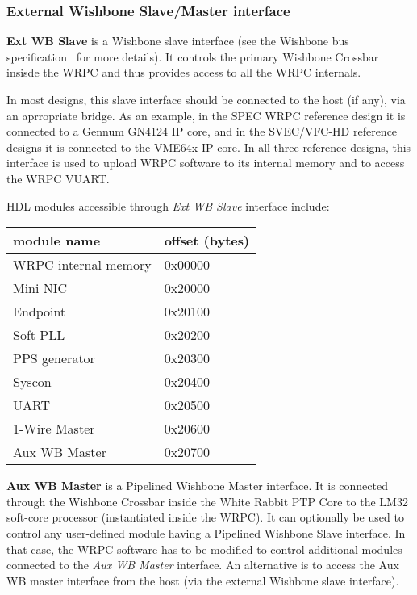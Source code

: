 \subsubsection{External Wishbone Slave/Master interface}
\label{sec:wrpc_wb}

{\bf Ext WB Slave} is a Wishbone slave interface (see the Wishbone bus specification~\cite{wb_spec}
for more details). It controls the primary Wishbone Crossbar insisde the WRPC and thus provides
access to all the WRPC internals.

In most designs, this slave interface should be connected to the host (if any), via an aprropriate
bridge. As an example, in the SPEC WRPC reference design it is connected to a Gennum GN4124 IP core,
and in the SVEC/VFC-HD reference designs it is connected to the VME64x IP core.  In all three
reference designs, this interface is used to upload WRPC software to its internal memory and to
access the WRPC VUART.

HDL modules accessible through \emph{Ext WB Slave} interface include:
\begin{center}
  \begin{tabular}{|l|l|}
    \hline {\bf module name} & {\bf offset (bytes)}\\
    \hline
    WRPC internal memory & 0x00000\\
                Mini NIC & 0x20000\\
                Endpoint & 0x20100\\
                Soft PLL & 0x20200\\
           PPS generator & 0x20300\\
                  Syscon & 0x20400\\
                    UART & 0x20500\\
           1-Wire Master & 0x20600\\
           Aux WB Master & 0x20700\\
    \hline
  \end{tabular}
\end{center}

{\bf Aux WB Master} is a Pipelined Wishbone Master interface. It is connected through the Wishbone
Crossbar inside the White Rabbit PTP Core to the LM32 soft-core processor (instantiated inside the
WRPC). It can optionally be used to control any user-defined module having a Pipelined Wishbone
Slave interface. In that case, the WRPC software has to be modified to control additional modules
connected to the \emph{Aux WB Master} interface. An alternative is to access the Aux WB master
interface from the host (via the external Wishbone slave interface).

